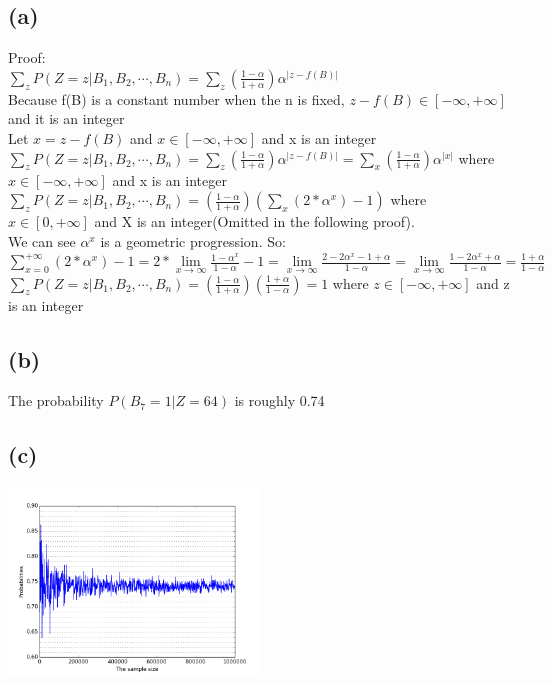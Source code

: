\documentclass [11pt, a4paper, oneside] {article}
\begin{document}
\subsection *{(a)}
Proof:\\
$\sum\limits_zP(Z=z|B_1, B_2, \cdots, B_n) = \sum\limits_z(\frac{1-\alpha}{1+\alpha})\alpha^{|z-f(B)|}$\\
Because f(B) is a constant number when the n is fixed, $z-f(B)\in [-\infty, +\infty]$ and it is an integer\\
Let $x = z-f(B)$ and $x \in [-\infty, +\infty]$ and x is an integer\\
$\sum\limits_zP(Z=z|B_1, B_2, \cdots, B_n) = \sum\limits_z(\frac{1-\alpha}{1+\alpha})\alpha^{|z-f(B)|} = \sum\limits_x(\frac{1-\alpha}{1+\alpha})\alpha^{|x|} $ where $x \in [-\infty, +\infty]$ and x is an integer\\
$\sum\limits_zP(Z=z|B_1, B_2, \cdots, B_n) = (\frac{1-\alpha}{1+\alpha})(\sum\limits_x(2*\alpha^{x}) - 1) $ where $x \in [0, +\infty]$ and X is an integer(Omitted in the following proof).\\
We can see $\alpha^{x}$ is a geometric progression. So:\\
$\sum\limits_{x=0}^{+\infty}(2*\alpha^{x}) - 1 = 2*\lim\limits_{x\to\infty}\frac{1-\alpha^{x}}{1-\alpha} - 1 = \lim\limits_{x\to\infty}\frac{2-2\alpha^{x}-1+\alpha}{1-\alpha} =
\lim\limits_{x\to\infty}\frac{1-2\alpha^{x}+\alpha}{1-\alpha} = \frac{1+\alpha}{1-\alpha}$\\
$\sum\limits_zP(Z=z|B_1, B_2, \cdots, B_n)  =  (\frac{1-\alpha}{1+\alpha})(\frac{1+\alpha}{1-\alpha}) = 1$ where $z \in [-\infty, +\infty]$ and z is an integer\\
\subsection *{(b)}
The probability $P(B_7=1|Z=64)$ is roughly 0.74\\
\subsection *{(c)}
\includegraphics[height=5cm]{32.png}
\end{document}
